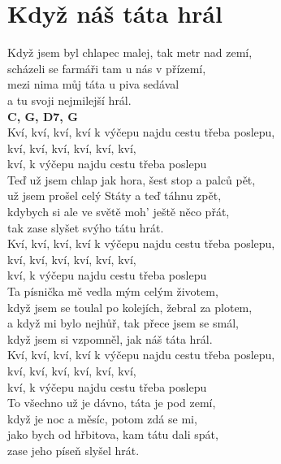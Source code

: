 \section{Když náš táta hrál}
\onehalfspacing

Když jsem byl chlapec malej, tak metr nad zemí,\\
scházeli se farmáři tam u nás v přízemí,\\
mezi nima můj táta u piva sedával\\
a tu svoji nejmilejší hrál.\\
\textbf{C, G, D7, G}\\

Kví, kví, kví, kví k výčepu najdu cestu třeba poslepu, \\
kví, kví, kví, kví, kví, kví, \\
kví, k výčepu najdu cestu třeba poslepu\\

Teď už jsem chlap jak hora, šest stop a palců pět,\\
už jsem prošel celý Státy a teď táhnu zpět,\\
kdybych si ale ve světě moh' ještě něco přát,\\
tak zase slyšet svýho tátu hrát.\\

Kví, kví, kví, kví k výčepu najdu cestu třeba poslepu, \\
kví, kví, kví, kví, kví, kví, \\
kví, k výčepu najdu cestu třeba poslepu\\

Ta písnička mě vedla mým celým životem,\\
když jsem se toulal po kolejích, žebral za plotem,\\
a když mi bylo nejhůř, tak přece jsem se smál,\\
když jsem si vzpomněl, jak náš táta hrál.\\

Kví, kví, kví, kví k výčepu najdu cestu třeba poslepu, \\
kví, kví, kví, kví, kví, kví, \\
kví, k výčepu najdu cestu třeba poslepu\\

To všechno už je dávno, táta je pod zemí,\\
když je noc a měsíc, potom zdá se mi,\\
jako bych od hřbitova, kam tátu dali spát,\\
zase jeho píseň slyšel hrát.\\

